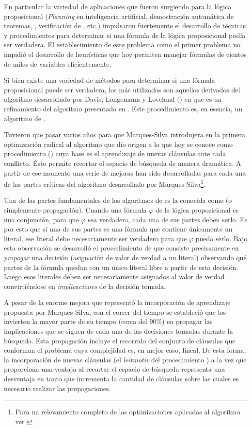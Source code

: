 En particular la variedad de aplicaciones que fueron surgiendo para la lógica
proposicional (\emph{Planning} en inteligencia artificial, demostración
automática de teoremas, \mc, verificación de \soft, etc.)
impulsaron fuertemente el desarrollo de técnicas y procedimientos para
determinar si una fórmula de la lógica proposicional podía ser verdadera. El
establecimiento de este problema como el primer problema \npc
\cite{Cook:1971:CTP:800157.805047} no impidió el desarrollo de heurísticas que
hoy permiten manejar fórmulas de cientos de miles de variables eficientemente.

Si bien existe una variedad de métodos para determinar si una fórmula
proposicional puede ser verdadera, los más utilizados son aquellos derivados
del algoritmo desarrollado por Davis, Longemann y Loveland (\dpll) en
\cite{Davis:1962:MPT:368273.368557} que es un refinamiento del algoritmo
presentado en \cite{Davis:1960:CPQ:321033.321034}. Este procedimiento es, en
esencia, un algoritmo de \bt.

Tuvieron que pasar varios años para que Marques-Silva introdujera en \cite
{marques-silva:iccad96} la primera optimización radical al algoritmo \dpll que
dio origen a lo que hoy se conoce como procedimiento \cdcl (\CDCL) cuya base
es el aprendizaje de nuevas cláusulas ante cada conflicto. Ésto permite
recortar el espacio de búsqueda de manera dramática. A partir de ese momento
una serie de mejoras han sido desarrolladas para cada una de las partes
críticas del algoritmo desarrollado por Marques-Silva\footnote{Para un
relevamiento completo de las optimizaciones aplicadas al algoritmo \CDCL ver
\cite{manthey:mathesis}}.

Una de las partes fundamentales de los algoritmos de \ssolving es la conocida
como \bcp (o simplemente propagación). Cuando una fórmula $\varphi$ de la
lógica proposicional es una conjunción, para que $\varphi$ sea
verdadera, cada una de sus partes deben serlo. Es por esto que si una
de sus partes es una fórmula que contiene únicamente un literal, ese literal
debe necesariamente ser verdadero para que $\varphi$ pueda serlo. Bajo
esta observación se desarrolló el procedimiento de \BCP que consiste
precisamente en \emph{propagar} una decisión (asignación de valor de verdad a
un literal) observando qué partes de la fórmula quedan con un único literal
libre a partir de esta decisión. Luego esos literales deben ser necesariamente
asignados al valor de verdad \T convirtiéndose en \emph{implicaciones} de la
decisión tomada.

A pesar de la enorme mejora que representó la incorporación de aprendizaje
propuesta por Marques-Silva, con el correr del tiempo se estableció que los
\ssolvers invierten la mayor parte de su tiempo (cerca del $90\%$) en propagar
las implicaciones que se siguen de cada una de las decisiones tomadas durante
la búsqueda. Esta propagación incluye el recorrido del conjunto de cláusulas
que conforman el problema cuya complejidad es, en mejor caso, lineal. De esta
forma, la incorporación de nuevas cláusulas (el \emph{leitmotiv} del
procedimiento \CDCL) a la vez que proporciona una ventaja al recortar el
espacio de búsqueda representa una desventaja en tanto que incrementa la
cantidad de cláusulas sobre las cuales es necesario realizar las
propagaciones.

